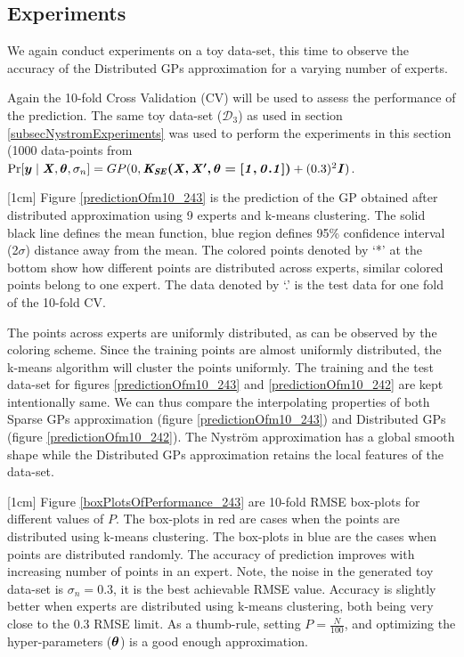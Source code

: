 \subsection{Experiments}\label{subSecDistributedExperiments}
We again conduct experiments on a toy data-set, this time to observe the accuracy of the Distributed GPs approximation for a varying number of experts. 

Again the 10-fold Cross Validation (CV) will be used to assess the performance of the prediction. The same toy data-set ($\mathcal{D}_{3}$) as used in section \ref{subsecNystromExperiments} was used to perform the experiments in this section (1000 data-points from $\Pr[\boldsymbol{y} \mid \bm{\mathit{X}}, \boldsymbol{\theta}, \sigma_{n}] = GP(0, \bm{\mathit{K_{SE}(X, X', \theta = [1, 0.1])}} + (0.3)^{2}\bm{\mathit{I}})$.

[1cm]
Figure \ref{predictionOfm10_243} is the prediction of the GP obtained after distributed approximation using 9 experts and k-means clustering. The solid black line defines the mean function, blue region defines 95\% confidence interval (2$\sigma$) distance away from the mean. The colored points denoted by `*' at the bottom show how different points are distributed across experts, similar colored points belong to one expert. The data denoted by `.' is the test data for one fold of the 10-fold CV. 

The points across experts are uniformly distributed, as can be observed by the coloring scheme. Since the training points are almost uniformly distributed, the k-means algorithm will cluster the points uniformly. The training and the test data-set for figures \ref{predictionOfm10_243} and \ref{predictionOfm10_242} are kept intentionally same. We can thus compare the interpolating properties of both Sparse GPs approximation (figure \ref{predictionOfm10_243}) and Distributed GPs (figure \ref{predictionOfm10_242}). The Nystr\"{o}m approximation has a global smooth shape while the Distributed GPs approximation retains the local features of the data-set. 

[1cm]
Figure \ref{boxPlotsOfPerformance_243} are 10-fold RMSE box-plots for different values of $P$. The box-plots in red are cases when the points are distributed using k-means clustering. The box-plots in blue are the cases when points are distributed randomly. The accuracy of prediction improves with increasing number of points in an expert. Note, the noise in the generated toy data-set is $\sigma_{n}=0.3$, it is the best achievable RMSE value. Accuracy is slightly better when experts are distributed using k-means clustering, both being very close to the $0.3$ RMSE limit. As a thumb-rule, setting $P = \frac{N}{100}$, and optimizing the hyper-parameters ($\boldsymbol{\theta}$) is a good enough approximation. 


